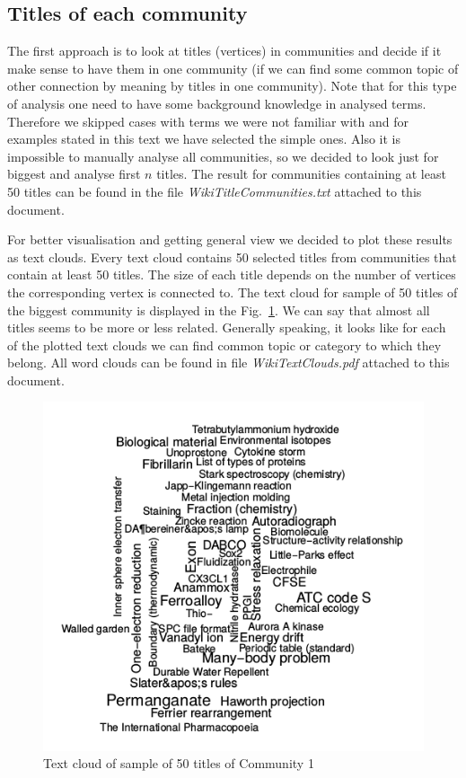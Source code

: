 \documentclass[paper=a4, fontsize=11pt]{scrartcl} %
\begin{document}
\subsection{Titles of each community}
The first approach is to look at titles (vertices) in communities and decide if it make sense to have them in one community (if we can find some common topic of other connection by meaning by titles in one community). Note that for this type of analysis one need to have some background knowledge in analysed terms. Therefore we skipped cases with terms we were not familiar with and for examples stated in this text we have selected the simple ones. Also it is impossible to manually analyse all communities, so we decided to look just for biggest and analyse first $n$ titles. The result for communities containing at least 50 titles can be found in the file \textit{WikiTitleCommunities.txt} attached to this document. 

For better visualisation and getting general view we decided to plot these results as text clouds. Every text cloud contains 50 selected titles from communities that contain at least 50 titles. The size of each title depends on the number of vertices the corresponding vertex is connected to. The text cloud for sample of 50 titles of the biggest community is displayed in the Fig.~\ref{TextCloud1}. We can say that almost all titles seems to be more or less related. Generally speaking, it looks like for each of the plotted text clouds we can find common topic or category to which they belong. All word clouds can be found in file \textit{WikiTextClouds.pdf} attached to this document.

\begin{figure}[H]
	\centering
	\includegraphics[scale=0.75,keepaspectratio]{TextCloud1}
	\caption{Text cloud of sample of 50 titles of Community 1}
	\label{TextCloud1}
\end{figure}
\end{document}
